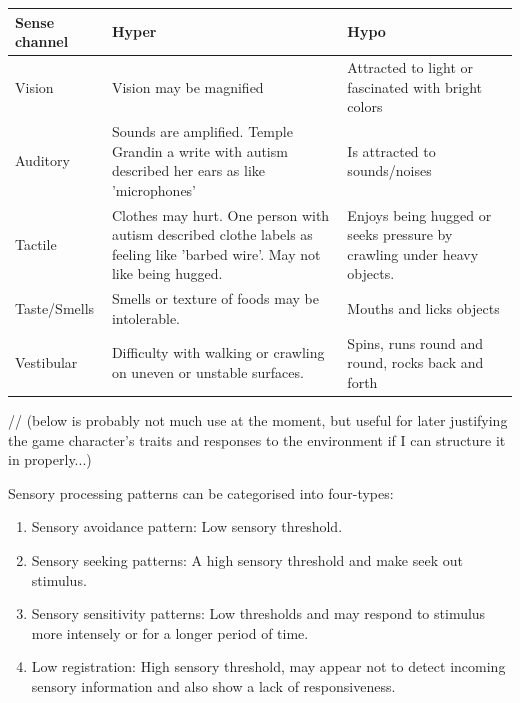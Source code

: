 \documentclass[11pt]{report}
\begin{document}
\begin{table}
    \begin{tabular}{| l | p{5cm} | p{5cm} |}
    \hline
    Sense channel & Hyper                                                                                                                      & Hypo                                                                   \\
    \hline
    \hline
    Vision        & Vision may be magnified                                                                                                    & Attracted to light or fascinated with bright colors                    \\
    \hline
    Auditory      & Sounds are amplified. Temple Grandin a write with autism described her ears as like 'microphones'                          & Is attracted to sounds/noises                                          \\
    \hline
    Tactile       & Clothes may hurt. One person with autism described clothe labels as feeling like 'barbed wire'. May not like being hugged. & Enjoys being hugged or seeks pressure by crawling under heavy objects. \\
    \hline
    Taste/Smells & Smells or texture of foods may be intolerable. & Mouths and licks objects \\
    \hline
    Vestibular & Difficulty with walking or crawling on uneven or unstable surfaces. & Spins, runs round and round, rocks back and forth \\
    \hline
    \end{tabular}
\end{table}

// (below is probably not much use at the moment, but useful for later justifying the game character's traits and responses to the environment if I can structure it in properly...)

Sensory processing patterns can be categorised into four-types\cite{sensory_leisure}:

\begin{enumerate}
\item Sensory avoidance pattern: Low sensory threshold. 
\item Sensory seeking patterns: A high sensory threshold and make seek out stimulus.
\item Sensory sensitivity patterns: Low thresholds and may respond to stimulus more intensely or for a longer period of time.
\item Low registration: High sensory threshold, may appear not to detect incoming sensory information and also show a lack of responsiveness.
\end{enumerate}
\end{document}

